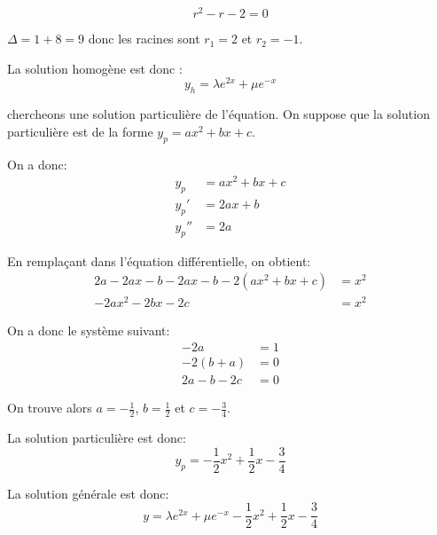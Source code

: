 \documentclass{article}
\begin{document}
\begin{equation*}
r^2 - r - 2 = 0
\end{equation*}

$\Delta = 1 + 8 = 9$ donc les racines sont $r_1 = 2$ et $r_2 = -1$.

La solution homogène est donc :
\begin{equation*}
    y_h = \lambda e^{2x} + \mu e^{-x}
\end{equation*}

chercheons une solution particulière de l'équation.
On suppose que la solution particulière est de la forme $y_p = ax^2 + bx + c$.

On a donc:
\begin{equation*}
\begin{aligned}
    y_p &= ax^2 + bx + c \\
    y_p' &= 2ax + b \\
    y_p'' &= 2a
\end{aligned}
\end{equation*}

En remplaçant dans l'équation différentielle, on obtient:
\begin{equation*}
\begin{aligned}
    2a - 2ax - b - 2ax - b - 2(ax^2 + bx + c) &= x^2 \\
    -2ax^2 - 2bx - 2c &= x^2
\end{aligned}
\end{equation*}

On a donc le système suivant:
\begin{equation*}
\begin{aligned}
    -2a &= 1 \\
    -2(b + a) &= 0 \\
    2a - b - 2c &= 0
\end{aligned}
\end{equation*}

On trouve alors $a = -\frac{1}{2}$, $b = \frac{1}{2}$ et $c = -\frac{3}{4}$.

La solution particulière est donc:
\begin{equation*}
    y_p = -\frac{1}{2}x^2 + \frac{1}{2}x - \frac{3}{4}
\end{equation*}

La solution générale est donc:
\begin{equation*}
    y = \lambda e^{2x} + \mu e^{-x} -\frac{1}{2}x^2 + \frac{1}{2}x - \frac{3}{4}
\end{equation*}
\end{document}
